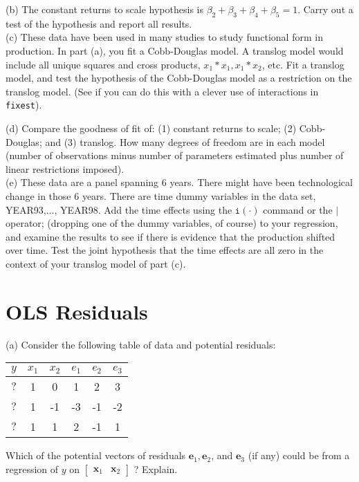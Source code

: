 \documentclass[11pt]{article}
\begin{document}
(b) The constant returns to scale hypothesis is $\beta_2+\beta_3+\beta_4+\beta_5=1$. Carry out a test of the hypothesis and report all results.\\

(c) These data have been used in many studies to study functional form in production. In part (a), you fit a Cobb-Douglas model. A translog model would include all unique squares and cross products, $x_1 * x_1, x_1 * x_2$, etc. Fit a translog model, and test the hypothesis of the Cobb-Douglas model as a restriction on the translog model. (See if you can do this with a clever use of interactions in \texttt{fixest}).



(d) Compare the goodness of fit of: (1) constant returns to scale; (2) Cobb-Douglas; and (3) translog. How many degrees of freedom are in each model (number of observations minus number of parameters estimated plus number of linear restrictions imposed).\\

(e) These data are a panel spanning 6 years. There might have been technological change in those 6 years. There are time dummy variables in the data set, YEAR93,..., YEAR98. Add the time effects using the $\texttt{i}(\cdot)$ command or the $|$ operator; (dropping one of the dummy variables, of course) to your regression, and examine the results to see if there is evidence that the production shifted over time. Test the joint hypothesis that the time effects are all zero in the context of your translog model of part (c).

\section{OLS Residuals}

(a) Consider the following table of data and potential residuals:\
\begin{tabular}{cccccc}
$y$ & $x_1$ & $x_2$ & $e_1$ & $e_2$ & $e_3$ \\
\hline$?$ & 1 & 0 & 1 & 2 & 3 \\
$?$ & 1 & -1 & -3 & -1 & -2 \\
$?$ & 1 & 1 & 2 & -1 & 1
\end{tabular}

Which of the potential vectors of residuals $\boldsymbol{e}_1, \boldsymbol{e}_2$, and $\boldsymbol{e}_3$ (if any) could be from a regression of $y$ on $\left[\begin{array}{ll}\boldsymbol{x}_1 & \boldsymbol{x}_2\end{array}\right]$ ? Explain.\\
\end{document}

